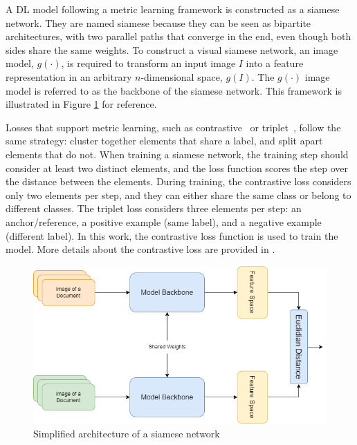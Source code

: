 A \gls{DL} model following a metric learning framework is constructed as a siamese network. They are named siamese because they can be seen as bipartite architectures, with two parallel paths that converge in the end, even though both sides share the same weights. To construct a visual siamese network, an image model, \( g(\cdot) \), is required to transform an input image \( I \) into a feature representation in an arbitrary $n$-dimensional space, \( g(I) \). The  \( g(\cdot) \) image model is referred to as the backbone of the siamese network. This framework is illustrated in Figure \ref{fig:siamese} for reference.

Losses that support metric learning, such as contrastive~\cite{chopra_learning_2005} or triplet~\cite{triplet}, follow the same strategy: cluster together elements that share a label, and split apart elements that do not. When training a siamese network, the training step should consider at least two distinct elements, and the loss function scores the step over the distance between the elements. During training, the contrastive loss considers only two elements per step, and they can either share the same class or belong to different classes. The triplet loss considers three elements per step: an anchor/reference, a positive example (same label), and a negative example (different label). In this work, the contrastive loss function is used to train the model. More details about the contrastive loss are provided in .%


\begin{figure}[htbp]
\label{fig:siamese}
\centering
\includegraphics[width=0.9\linewidth]{images/siamese.png}
\caption{Simplified architecture of a siamese network}
\end{figure}

